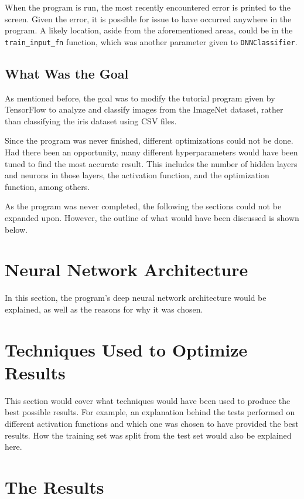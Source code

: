 \documentclass{article}
\begin{document}
When the program is run, the most recently encountered error is printed
to the screen. Given the error, it is possible for issue to have occurred
anywhere in the program. A likely location, aside from the aforementioned
areas, could be in the \texttt{train\_input\_fn} function, which was another parameter
given to \texttt{DNNClassifier}.

\subsection{What Was the Goal}

As mentioned before, the goal was to modify the tutorial program
given by TensorFlow to analyze and classify images from the ImageNet
dataset, rather than classifying the iris dataset using CSV files.

Since the program was never finished, different optimizations could
not be done. Had there been an opportunity, many different hyperparameters
would have been tuned to find the most accurate result. This includes the
number of hidden layers and neurons in those layers, the activation function,
and the optimization function, among others.

As the program was never completed, the following the sections could not be
expanded upon. However, the outline of what would have been
discussed is shown below.

\section{Neural Network Architecture}

In this section, the program's deep neural network architecture would
be explained, as well as the reasons for why it was chosen.

\section{Techniques Used to Optimize Results}

This section would cover what techniques would have been used
to produce the best possible results. For example, an explanation
behind the tests performed on different activation functions and
which one was chosen to have provided the best results. How the
training set was split from the test set would also be explained here.

\section{The Results}
\end{document}
